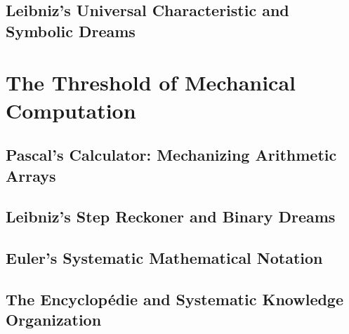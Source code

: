 \documentclass[12pt, oneside, openany]{book}
\let\oldchapter\chapter
\renewcommand{\chapter}{
	\cleardoublepage
	\thispagestyle{chapter}
	\oldchapter
}
\begin{document}
\section{Leibniz's Universal Characteristic and Symbolic Dreams}


\chapter{The Threshold of Mechanical Computation}

\section{Pascal's Calculator: Mechanizing Arithmetic Arrays}

\section{Leibniz's Step Reckoner and Binary Dreams}

\section{Euler's Systematic Mathematical Notation}

\section{The Encyclopédie and Systematic Knowledge Organization}

\end{document}

